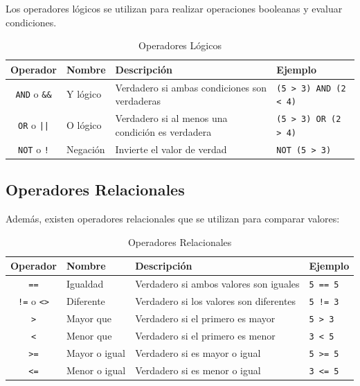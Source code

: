 \documentclass[12pt]{article}
\newcommand{\codigo}[1]{\texttt{\small #1}}
\begin{document}
Los operadores lógicos se utilizan para realizar operaciones booleanas y evaluar condiciones.

\begin{table}[H]
    \centering
    \caption{Operadores Lógicos}
    \label{tab:operadores_logicos}
    \small
    \begin{tabular}{clp{6cm}l}
        \toprule
        \textbf{Operador} & \textbf{Nombre} & \textbf{Descripción} & \textbf{Ejemplo} \\
        \midrule
        \codigo{AND} o \codigo{\&\&} & Y lógico & Verdadero si ambas condiciones son verdaderas & \codigo{(5 > 3) AND (2 < 4)} \\
        \codigo{OR} o \codigo{||} & O lógico & Verdadero si al menos una condición es verdadera & \codigo{(5 > 3) OR (2 > 4)} \\
        \codigo{NOT} o \codigo{!} & Negación & Invierte el valor de verdad & \codigo{NOT (5 > 3)} \\
        \bottomrule
    \end{tabular}
\end{table}

\subsection{Operadores Relacionales}

Además, existen operadores relacionales que se utilizan para comparar valores:

\begin{table}[H]
    \centering
    \caption{Operadores Relacionales}
    \label{tab:operadores_relacionales}
    \small
    \begin{tabular}{clp{5.5cm}l}
        \toprule
        \textbf{Operador} & \textbf{Nombre} & \textbf{Descripción} & \textbf{Ejemplo} \\
        \midrule
        \codigo{==} & Igualdad & Verdadero si ambos valores son iguales & \codigo{5 == 5} \\
        \codigo{!=} o \codigo{<>} & Diferente & Verdadero si los valores son diferentes & \codigo{5 != 3} \\
        \codigo{>} & Mayor que & Verdadero si el primero es mayor & \codigo{5 > 3} \\
        \codigo{<} & Menor que & Verdadero si el primero es menor & \codigo{3 < 5} \\
        \codigo{>=} & Mayor o igual & Verdadero si es mayor o igual & \codigo{5 >= 5} \\
        \codigo{<=} & Menor o igual & Verdadero si es menor o igual & \codigo{3 <= 5} \\
        \bottomrule
    \end{tabular}
\end{table}
\end{document}
